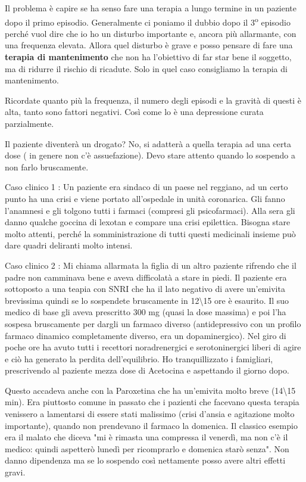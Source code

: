 Il problema è capire se ha senso fare una terapia a lungo termine in un
paziente dopo il primo episodio. Generalmente ci poniamo il dubbio dopo
il 3\textsuperscript{o} episodio perché vuol dire che io ho un disturbo importante e,
ancora più allarmante, con una frequenza elevata. Allora quel disturbo è
grave e posso pensare di fare una \textbf{terapia di mantenimento} che
non ha l'obiettivo di far star bene il soggetto, ma di ridurre il
rischio di ricadute. Solo in quel caso consigliamo la terapia di
mantenimento.

Ricordate quanto più la frequenza, il numero degli episodi e la gravità
di questi è alta, tanto sono fattori negativi. Così come lo è una
depressione curata parzialmente.

Il paziente diventerà un drogato? No, si adatterà a quella terapia ad
una certa dose ( in genere non c'è assuefazione). Devo stare attento
quando lo sospendo a non farlo bruscamente.

Caso clinico 1 : Un paziente era sindaco di un paese nel reggiano, ad un
certo punto ha una crisi e viene portato all'ospedale in unità
coronarica. Gli fanno l'anamnesi e gli tolgono tutti i farmaci (compresi
gli psicofarmaci). Alla sera gli danno qualche goccina di lexotan e
compare una crisi epilettica. Bisogna stare molto attenti, perché la
somministrazione di tutti questi medicinali insieme può dare quadri
deliranti molto intensi.

Caso clinico 2 : Mi chiama allarmata la figlia di un altro paziente
rifrendo che il padre non camminava bene e aveva difficolatà a stare in
piedi. Il paziente era sottoposto a una teapia con SNRI che ha il lato
negativo di avere un'emivita brevissima quindi se lo sospendete
bruscamente in 12\textbackslash{}15 ore è esaurito. Il suo medico di
base gli aveva prescritto 300 mg (quasi la dose massima) e poi l'ha
sospesa bruscamente per dargli un farmaco diverso (antidepressivo con un
profilo farmaco dinamico completamente diverso, era un dopaminergico).
Nel giro di poche ore ha avuto tutti i recettori noradrenergici e
serotoninergici liberi di agire e ciò ha generato la perdita
dell'equilibrio. Ho tranquillizzato i famigliari, prescrivendo al
paziente mezza dose di Acetocina e aspettando il giorno dopo.

Questo accadeva anche con la Paroxetina che ha un'emivita molto breve
(14\textbackslash{}15 min). Era piuttosto comune in passato che i
pazienti che facevano questa terapia venissero a lamentarsi di essere
stati malissimo (crisi d'ansia e agitazione molto importante), quando
non prendevano il farmaco la domenica. Il classico esempio era il malato
che diceva "mi è rimasta una compressa il venerdì, ma non c'è il medico:
quindi aspetterò lunedì per ricomprarlo e domenica starò senza". Non
danno dipendenza ma se lo sospendo così nettamente posso avere altri
effetti gravi.

